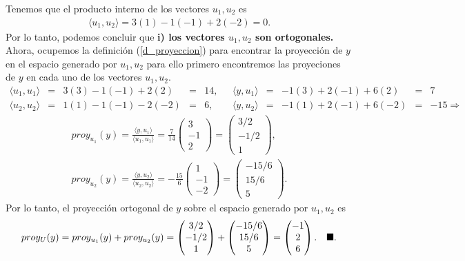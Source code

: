 \documentclass[11pt,letterpaper]{article}
\newcommand{\finf}{\blacksquare.}
\begin{document}
\begin{itemize}
Tenemos que el producto interno de los vectores $u_1, u_2$ es
\begin{align*}
\langle u_1, u_2 \rangle= 3(1)-1(-1)+2(-2)=0.
\end{align*}
Por lo tanto, podemos concluir que \textbf{i) los vectores $u_1, u_2$ son ortogonales. } Ahora, ocupemos la definición (\ref{d_proyeccion}) para encontrar la proyección de $y$ en el espacio generado por $u_1, u_2$ para ello primero encontremos las proyeciones de $y$ en cada uno de los vectores $u_1, u_2$.
\begin{align*}
\langle u_1, u_1 \rangle &=& 3(3)-1(-1)+2(2) &=& 14,\ \ \ & \langle y, u_1 \rangle &=& -1(3)+2(-1)+6(2) &=& 7\\
\langle u_2, u_2 \rangle &=& 1(1)-1(-1)-2(-2)&=&6,\ \ \ & \langle y, u_2 \rangle &=& -1(1)+2(-1)+6(-2)&=&-15\Rightarrow
\end{align*} 
\begin{align*}
proy_{u_1}(y)=\frac{\langle y, u_1 \rangle}{\langle u_1,u_1 \rangle}=\frac{7}{14}\begin{pmatrix} 3\\ -1 \\ 2 \end{pmatrix}=\begin{pmatrix} 3/2\\ -1/2 \\ 1\end{pmatrix},\\
proy_{u_2}(y)=\frac{\langle y, u_2 \rangle}{\langle u_2,u_2 \rangle}=-\frac{15}{6}\begin{pmatrix} 1\\ -1 \\-2 \end{pmatrix}=\begin{pmatrix} -15/6\\ 15/6 \\ 5\end{pmatrix}.
\end{align*}
Por lo tanto, el proyección ortogonal de $y$ sobre el espacio generado por $u_1,u_2$ es
\begin{align*}
proy_U (y) = proy_{u_1}(y) + proy_{u_2}(y)=\begin{pmatrix} 3/2\\ -1/2 \\ 1\end{pmatrix}+ \begin{pmatrix} -15/6\\ 15/6 \\ 5\end{pmatrix} =\bf \begin{pmatrix}
-1\\ 2\\ 6
\end{pmatrix}. \ \ \ \finf
\end{align*}



\end{itemize}
\end{document}

